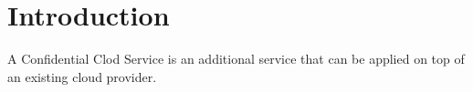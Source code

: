 \section{Introduction}
	A Confidential Clod Service is an additional service that can be applied on top of an existing cloud provider. 
